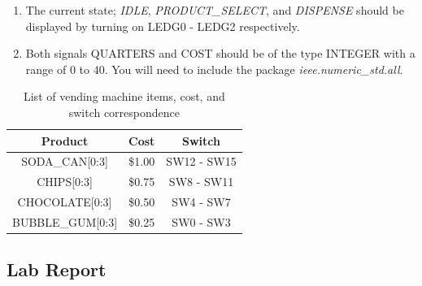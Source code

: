 \begin{enumerate}
	\item The current state; \emph{IDLE}, \emph{PRODUCT\_SELECT}, and \emph{DISPENSE} should be displayed by turning on LEDG0 - LEDG2 respectively.
	
	\item Both signals QUARTERS and COST should be of the type INTEGER with a range of 0 to 40. You will need to include the package \emph{ieee.numeric\_std.all}.

\end{enumerate}

\begin{table}[H]
	\centering
	\caption{List of vending machine items, cost, and switch correspondence}
	\begin{tabular}{ | c | c | c | }
		\hline                        
 		\bf Product & \bf Cost & \bf Switch\\ \hline
 		SODA\_CAN[0:3] & \$1.00 & SW12 - SW15 \\ \hline
		CHIPS[0:3] & \$0.75 & SW8 - SW11 \\ \hline
		CHOCOLATE[0:3] & \$0.50 & SW4 - SW7 \\ \hline
		BUBBLE\_GUM[0:3] & \$0.25 & SW0 - SW3 \\
 		\hline
	\end{tabular}
	\label{tab:costlist}
\end{table}


\subsection{Lab Report}


